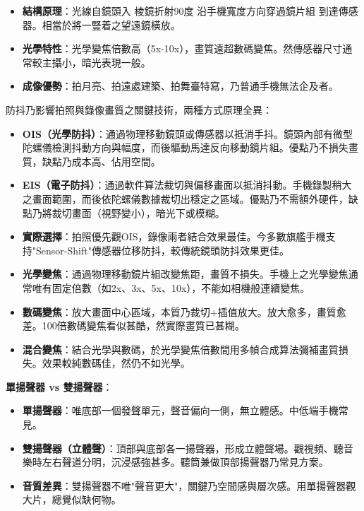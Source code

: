 \begin{itemize}
  \item \textbf{結構原理}：光線自鏡頭入 棱鏡折射90度 沿手機寬度方向穿過鏡片組 到達傳感器。相當於將一豎着之望遠鏡橫放。
  \item \textbf{光學特性}：光學變焦倍數高（5x-10x），畫質遠超數碼變焦。然傳感器尺寸通常較主攝小，暗光表現一般。
  \item \textbf{成像優勢}：拍月亮、拍遠處建築、拍舞臺特寫，乃普通手機無法企及者。
\end{itemize}


防抖乃影響拍照與錄像畫質之關鍵技術，兩種方式原理全異：

\begin{itemize}
  \item \textbf{OIS（光學防抖）}：通過物理移動鏡頭或傳感器以抵消手抖。鏡頭內部有微型陀螺儀檢測抖動方向與幅度，而後驅動馬達反向移動鏡片組。優點乃不損失畫質，缺點乃成本高、佔用空間。
  \item \textbf{EIS（電子防抖）}：通過軟件算法裁切與偏移畫面以抵消抖動。手機錄製稍大之畫面範圍，而後依陀螺儀數據裁切出穩定之區域。優點乃不需額外硬件，缺點乃將裁切畫面（視野變小），暗光下或模糊。
  \item \textbf{實際選擇}：拍照優先觀OIS，錄像兩者結合效果最佳。今多數旗艦手機支持"Sensor-Shift"傳感器位移防抖，較傳統鏡頭防抖效果更佳。
\end{itemize}


\begin{itemize}
  \item \textbf{光學變焦}：通過物理移動鏡片組改變焦距，畫質不損失。手機上之光學變焦通常唯有固定倍數（如2x、3x、5x、10x），不能如相機般連續變焦。
  \item \textbf{數碼變焦}：放大畫面中心區域，本質乃裁切+插值放大。放大愈多，畫質愈差。100倍數碼變焦看似甚酷，然實際畫質已甚糊。
  \item \textbf{混合變焦}：結合光學與數碼，於光學變焦倍數間用多幀合成算法彌補畫質損失。效果較純數碼佳，然仍不如光學。
\end{itemize}


\textbf{單揚聲器 vs 雙揚聲器}：

\begin{itemize}
  \item \textbf{單揚聲器}：唯底部一個發聲單元，聲音偏向一側，無立體感。中低端手機常見。
  \item \textbf{雙揚聲器（立體聲）}：頂部與底部各一揚聲器，形成立體聲場。觀視頻、聽音樂時左右聲道分明，沉浸感強甚多。聽筒兼做頂部揚聲器乃常見方案。
  \item \textbf{音質差異}：雙揚聲器不唯"聲音更大"，關鍵乃空間感與層次感。用單揚聲器觀大片，總覺似缺何物。
\end{itemize}

